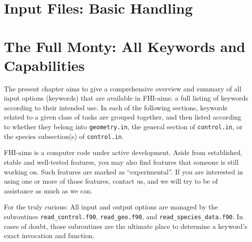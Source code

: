 \documentclass[12pt,a4paper,twoside,openany,titlepage,final]{book}
\begin{document}
\newpage

\tableofcontents





\chapter{Input Files: Basic Handling}
\label{Ch:basic}












\chapter{The Full Monty: All Keywords and Capabilities}
\label{Ch:full}

The present chapter aims to give a comprehensive overview and summary of all
input options (keywords) that are available in FHI-aims: a full listing of
keywords according to their intended use. In each of the following
sections, keywords related to a
given class of tasks are grouped together, and then listed according
to whether they belong into \texttt{geometry.in}, the general section
of \texttt{control.in}, or the species subsection(s) of
\texttt{control.in}.

FHI-aims is a computer
code under active development. Aside from established, stable and well-tested
features, you may also find features that someone is still working on. Such
features are marked as ``experimental''. If you are interested in using one or
more of those features, contact us, and we will try to be of assistance as
much as we can.

For the truly curious: All input and output options are managed by the
subroutines \texttt{read\_control.f90}, \texttt{read\_geo.f90}, and
\texttt{read\_species\_data.f90}. In cases of doubt, those subroutines
are the ultimate place to determine a keyword's exact invocation and
function.









\end{document}

